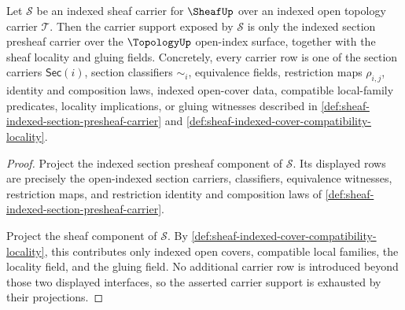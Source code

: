 \begin{theorem}
\label{thm:sheaf-carrier-support-obligation}
Let $\mathcal{S}$ be an indexed sheaf carrier for $\SheafUp$ over an indexed open topology carrier $\mathcal{T}$. Then the carrier support exposed by $\mathcal{S}$ is only the indexed section presheaf carrier over the $\TopologyUp$ open-index surface, together with the sheaf locality and gluing fields. Concretely, every carrier row is one of the section carriers $\mathsf{Sec}(i)$, section classifiers $\sim_i$, equivalence fields, restriction maps $\rho_{i,j}$, identity and composition laws, indexed open-cover data, compatible local-family predicates, locality implications, or gluing witnesses described in \autoref{def:sheaf-indexed-section-presheaf-carrier} and \autoref{def:sheaf-indexed-cover-compatibility-locality}.
\end{theorem}
\begin{proof}
Project the indexed section presheaf component of $\mathcal{S}$. Its displayed rows are precisely the open-indexed section carriers, classifiers, equivalence witnesses, restriction maps, and restriction identity and composition laws of \autoref{def:sheaf-indexed-section-presheaf-carrier}.

Project the sheaf component of $\mathcal{S}$. By \autoref{def:sheaf-indexed-cover-compatibility-locality}, this contributes only indexed open covers, compatible local families, the locality field, and the gluing field. No additional carrier row is introduced beyond those two displayed interfaces, so the asserted carrier support is exhausted by their projections.
\end{proof}

